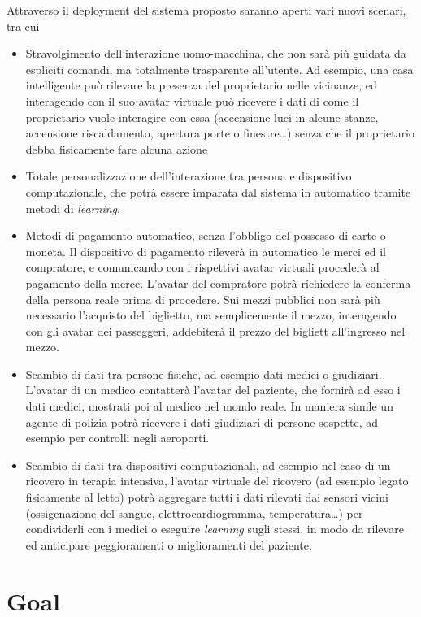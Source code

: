 \documentclass[a4paper,12pt]{report}
\begin{document}
Attraverso il deployment del sistema proposto saranno aperti vari nuovi scenari, tra cui
\begin{itemize}
	\item  Stravolgimento dell'interazione uomo-macchina, che non sarà più guidata da espliciti comandi, ma totalmente trasparente all'utente. Ad esempio, una casa intelligente può rilevare la presenza del proprietario nelle vicinanze, ed interagendo con il suo avatar virtuale può ricevere i dati di come il proprietario vuole interagire con essa (accensione luci in alcune stanze, accensione riscaldamento, apertura porte o finestre\dots) senza che il proprietario debba fisicamente fare alcuna azione
	\item Totale personalizzazione dell'interazione tra persona e dispositivo computazionale, che potrà essere imparata dal sistema in automatico tramite metodi di \emph{learning}.
	\item Metodi di pagamento automatico, senza l'obbligo del possesso di carte o moneta. Il dispositivo di pagamento rileverà in automatico le merci ed il compratore, e comunicando con i rispettivi avatar virtuali procederà al pagamento della merce. L'avatar del compratore potrà richiedere la conferma della persona reale prima di procedere. Sui mezzi pubblici non sarà più necessario l'acquisto del biglietto, ma semplicemente il mezzo, interagendo con gli avatar dei passeggeri, addebiterà il prezzo del bigliett all'ingresso nel mezzo.
	\item Scambio di dati tra persone fisiche, ad esempio dati medici o giudiziari. L'avatar di un medico contatterà l'avatar del paziente, che fornirà ad esso i dati medici, mostrati poi al medico nel mondo reale. In maniera simile un agente di polizia potrà ricevere i dati giudiziari di persone sospette, ad esempio per controlli negli aeroporti. 
	\item Scambio di dati tra dispositivi computazionali, ad esempio nel caso di un ricovero in terapia intensiva, l'avatar virtuale del ricovero (ad esempio legato fisicamente al letto) potrà aggregare tutti i dati rilevati dai sensori vicini (ossigenazione del sangue, elettrocardiogramma, temperatura\dots) per condividerli con i medici o eseguire \emph{learning} sugli stessi, in modo da rilevare ed anticipare peggioramenti o miglioramenti del paziente.
\end{itemize}

\section{Goal}
 
\end{document}
